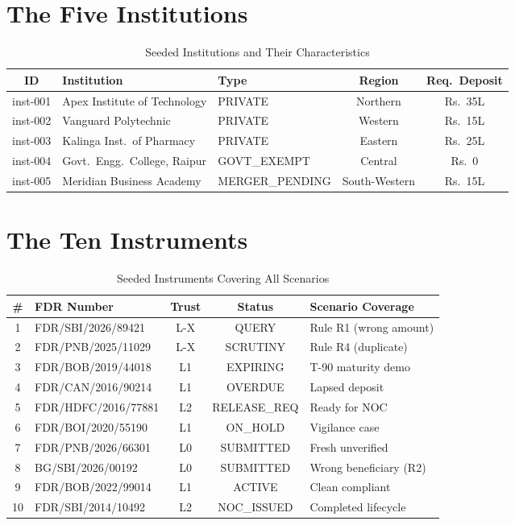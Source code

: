 \documentclass[12pt, a4paper]{report}
\newcommand{\rupee}{Rs.~}
\begin{document}
\section{The Five Institutions}

\begin{table}[H]
\centering
\caption{Seeded Institutions and Their Characteristics}
\begin{tabularx}{\textwidth}{|c|l|l|c|c|}
\hline
\textbf{ID} & \textbf{Institution} & \textbf{Type} & \textbf{Region} & \textbf{Req.\ Deposit} \\
\hline
inst-001 & Apex Institute of Technology & PRIVATE & Northern & \rupee 35L \\
inst-002 & Vanguard Polytechnic & PRIVATE & Western & \rupee 15L \\
inst-003 & Kalinga Inst.\ of Pharmacy & PRIVATE & Eastern & \rupee 25L \\
inst-004 & Govt.\ Engg.\ College, Raipur & GOVT\_EXEMPT & Central & \rupee 0 \\
inst-005 & Meridian Business Academy & MERGER\_PENDING & South-Western & \rupee 15L \\
\hline
\end{tabularx}
\end{table}

\section{The Ten Instruments}

\begin{table}[H]
\centering
\caption{Seeded Instruments Covering All Scenarios}
\label{tab:seed-instruments}
\begin{tabularx}{\textwidth}{|c|l|c|c|X|}
\hline
\textbf{\#} & \textbf{FDR Number} & \textbf{Trust} & \textbf{Status} & \textbf{Scenario Coverage} \\
\hline
1 & FDR/SBI/2026/89421 & L-X & QUERY & Rule R1 (wrong amount) \\
2 & FDR/PNB/2025/11029 & L-X & SCRUTINY & Rule R4 (duplicate) \\
3 & FDR/BOB/2019/44018 & L1 & EXPIRING & T-90 maturity demo \\
4 & FDR/CAN/2016/90214 & L1 & OVERDUE & Lapsed deposit \\
5 & FDR/HDFC/2016/77881 & L2 & RELEASE\_REQ & Ready for NOC \\
6 & FDR/BOI/2020/55190 & L1 & ON\_HOLD & Vigilance case \\
7 & FDR/PNB/2026/66301 & L0 & SUBMITTED & Fresh unverified \\
8 & BG/SBI/2026/00192 & L0 & SUBMITTED & Wrong beneficiary (R2) \\
9 & FDR/BOB/2022/99014 & L1 & ACTIVE & Clean compliant \\
10 & FDR/SBI/2014/10492 & L2 & NOC\_ISSUED & Completed lifecycle \\
\hline
\end{tabularx}
\end{table}
\end{document}
